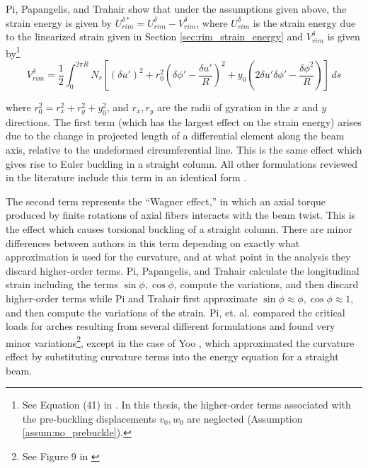 \documentclass[\rootdir/thesis.tex]{subfiles}
\begin{document}
Pi, Papangelis, and Trahair \cite{Pi1995} show that under the assumptions given above, the strain energy is given by $U_{rim}^{\delta*} = U_{rim}^{\delta} - V_{rim}^{\delta}$, where $U_{rim}^{\delta}$ is the strain energy due to the linearized strain given in Section \ref{sec:rim_strain_energy} and $V_{rim}^{\delta}$ is given by\footnote{See Equation (41) in \cite{Pi1995}. In this thesis, the higher-order terms associated with the pre-buckling displacements $v_0,w_0$ are neglected (Assumption \ref{assum:no_prebuckle}).}
\begin{equation}
\label{eq:V_rim}
V_{rim}^{\delta} = \frac{1}{2}\int_0^{2\pi R} N_r \left [
	(\delta u')^2 +
	r_0^2 \left(\delta\phi' - \frac{\delta u'}{R}\right)^2 +
	y_0 \left(2\delta u'\delta\phi' - \frac{\delta\phi^2}{R}\right)
\right] \, ds
\end{equation}

where $r_0^2 = r_x^2+r_y^2+y_0^2$, and $r_x,r_y$ are the radii of gyration in the $x$ and $y$ directions. The first term (which has the largest effect on the strain energy) arises due to the change in projected length of a differential element along the beam axis, relative to the undeformed circumferential line. This is the same effect which gives rise to Euler buckling in a straight column. All other formulations reviewed in the literature include this term in an identical form \cite{Pi1995,Lim2004,Ryu2012,Trahair1987,Guo2014,Pi2002}.

The second term represents the ``Wagner effect,'' in which an axial torque produced by finite rotations of axial fibers interacts with the beam twist. This is the effect which causes torsional buckling of a straight column. There are minor differences between authors in this term depending on exactly what approximation is used for the curvature, and at what point in the analysis they discard higher-order terms. Pi, Papangelis, and Trahair \cite{Pi1995} calculate the longitudinal strain including the terms $\sin{\phi},\cos{\phi}$, compute the variations, and then discard higher-order terms while Pi and Trahair \cite{Pi1992} first approximate $\sin{\phi}\approx \phi, \cos{\phi} \approx 1$, and then compute the variations of the strain. Pi, et. al. \cite{Pi2005} compared the critical loads for arches resulting from several different formulations and found very minor variations\footnote{See Figure 9 in \cite{Pi2005}}, except in the case of Yoo \cite{Yoo1982}, which approximated the curvature effect by substituting curvature terms into the energy equation for a straight beam.
\end{document}
